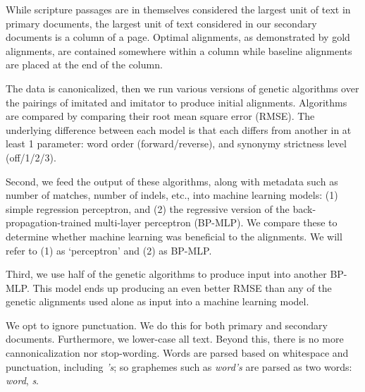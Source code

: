 While scripture passages are in themselves considered the largest unit of text in primary documents, the largest unit of text considered in our secondary documents is a column of a page. Optimal alignments, as demonstrated by gold alignments, are contained somewhere within a column while baseline alignments are placed at the end of the column.

The data is canonicalized, then we run various versions of genetic algorithms over the pairings of imitated and imitator to produce initial alignments. Algorithms are compared by comparing their root mean square error (RMSE). The underlying difference between each model is that each differs from another in at least 1 parameter: word order (forward/reverse), and synonymy strictness level (off/1/2/3).

Second, we feed the output of these algorithms, along with metadata such as number of matches, number of indels, etc., into machine learning models: (1) simple regression perceptron, and (2) the regressive version of the back-propagation-trained multi-layer perceptron (BP-MLP). We compare these to determine whether machine learning was beneficial to the alignments. We will refer to (1) as `perceptron' and (2) as BP-MLP.

Third, we use half of the genetic algorithms to produce input into another BP-MLP. This model ends up producing an even better RMSE than any of the genetic alignments used alone as input into a machine learning model.


We opt to ignore punctuation. We do this for both primary and secondary documents. Furthermore, we lower-case all text. Beyond this, there is no more cannonicalization nor stop-wording. Words are parsed based on whitespace and punctuation, including \textit{'s}; so graphemes such as \textit{word's} are parsed as two words: \textit{word}, \textit{s}. %

